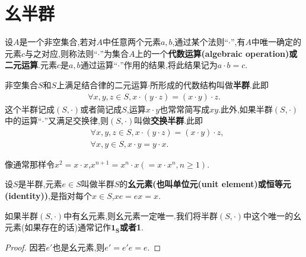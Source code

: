 \documentclass[../../main.tex]{subfiles}
\begin{document}
\section{幺半群}

\begin{definition}\label{definition:代数运算/二元运算定义}
设\(A\)是一个非空集合,若对\(A\)中任意两个元素\(a,b\),通过某个法则“\(\cdot\)”,有\(A\)中唯一确定的元素\(c\)与之对应,则称法则“\(\cdot\)”为集合\(A\)上的一个\textbf{代数运算(algebraic operation)或二元运算}.元素\(c\)是\(a,b\)通过运算“\(\cdot\)”作用的结果,将此结果记为\(a \cdot b = c\).
\end{definition}

\begin{definition}[半群和交换半群]
非空集合\(S\)和\(S\)上满足结合律的二元运算\(\cdot\)所形成的代数结构叫做\textbf{半群}.此即
\begin{align*}
\forall x, y, z \in S, x \cdot (y \cdot z) = (x \cdot y) \cdot z.
\end{align*}
这个半群记成\((S,\cdot)\)或者简记成\(S\),运算\(x\cdot y\)也常常简写成\(xy\).此外,如果半群\((S,\cdot)\)中的运算“$\cdot$”又满足交换律,则\((S,\cdot)\)叫做\textbf{交换半群}.此即
\begin{align*}
&\forall x, y, z \in S, x \cdot (y \cdot z) = (x \cdot y) \cdot z,\\
&\forall x,y\in S,x\cdot y=y\cdot x.
\end{align*}
\end{definition}
\begin{remark}
像通常那样令\(x^2 = x\cdot x\),\(x^{n + 1} = x^n\cdot x( = x\cdot x^n, n\geq1)\).
\end{remark}

\begin{definition}[幺元素]\label{definition:幺元素定义}
设\(S\)是半群,元素\(e\in S\)叫做半群\(S\)的\textbf{幺元素(也叫单位元(unit element)或恒等元(identity))},是指对每个\(x\in S\),\(xe = ex = x\).
\end{definition}

\begin{proposition}[幺元素存在必唯一]
如果半群$(S,\cdot)$中有幺元素,则幺元素一定唯一.我们将半群$(S,\cdot)$中这个唯一的幺元素(如果存在的话)通常记作$\boldsymbol{1_S}$\textbf{或者1}.
\end{proposition}
\begin{proof}
因若$e'$也是幺元素,则$e'=e'e=e$.
\end{proof}
\end{document}
